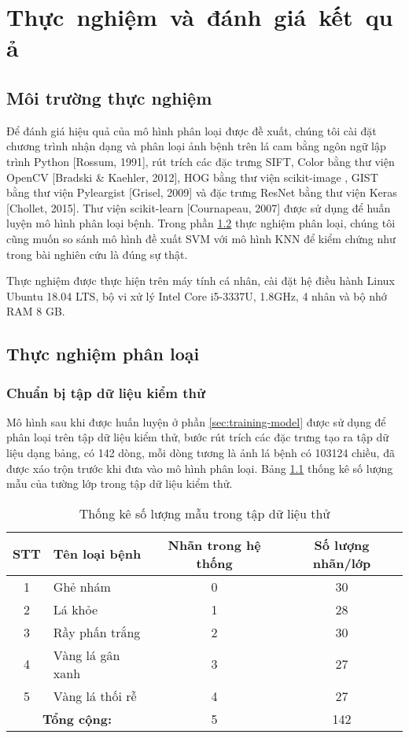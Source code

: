 \chapter{\mbox{Thực nghiệm và đánh giá kết quả}} \label{chapter04}


\section{Môi trường thực nghiệm}
Để đánh giá hiệu quả của mô hình phân loại được đề xuất, chúng tôi cài đặt chương trình nhận dạng và phân loại ảnh bệnh trên lá cam bằng ngôn ngữ lập trình Python [Rossum, 1991], rút trích các đặc trưng SIFT, Color bằng thư viện OpenCV [Bradski \& Kaehler, 2012], HOG bằng thư viện scikit-image \cite{scikit-image}, GIST bằng thư viện Pyleargist [Grisel, 2009] và đặc trưng ResNet bằng thư viện Keras [Chollet, 2015]. Thư viện scikit-learn [Cournapeau, 2007] được sử dụng để huấn luyện mô hình phân loại bệnh. Trong phần \ref{sec:thuc-nghiem-phan-loai} thực nghiệm phân loại, chúng tôi cũng muốn so sánh mô hình đề xuất SVM với mô hình KNN để kiểm chứng như trong bài nghiên cứu \cite{kim12012comparing} là đúng sự thật.\par
Thực nghiệm được thực hiện trên máy tính cá nhân, cài đặt hệ điều hành Linux Ubuntu 18.04 LTS, bộ vi xử lý Intel\textsuperscript{\textregistered} Core i5-3337U, 1.8GHz, 4 nhân và bộ nhớ RAM 8 GB.

\section{Thực nghiệm phân loại} \label{sec:thuc-nghiem-phan-loai}
\subsection{Chuẩn bị tập dữ liệu kiểm thử}
Mô hình sau khi được huấn luyện ở phần \ref{sec:training-model} được sử dụng để phân loại trên tập dữ liệu kiểm thử, bước rút trích các đặc trưng tạo ra tập dữ liệu dạng bảng, có 142 dòng, mỗi dòng tương là ảnh lá bệnh có 103124 chiều, đã được xáo trộn trước khi đưa vào mô hình phân loại. Bảng \ref{tab:statistics-label-test-dataset} thống kê số lượng mẫu của tường lớp trong tập dữ liệu kiểm thử.

\begin{table}[h]
\caption{Thống kê số lượng mẫu trong tập dữ liệu thử}
\centering
\begin{tabular}{|c|l|c|c|}
\hline 
\textbf{STT} & \textbf{Tên loại bệnh} & \textbf{Nhãn trong hệ thống} & \textbf{Số lượng nhãn/lớp}\\ [0.5ex] \hline \hline
1 & Ghẻ nhám & 0 & 30 \\
2 & Lá khỏe & 1 & 28 \\ 
3 & Rầy phấn trắng & 2 & 30 \\
4 & Vàng lá gân xanh & 3 & 27 \\
5 & Vàng lá thối rễ & 4 & 27 \\ \hline
\multicolumn{2}{|c|}{\textbf{Tổng cộng:}} & 5 & 142 \\ \hline
\end{tabular}
\label{tab:statistics-label-test-dataset}
\end{table}
 
